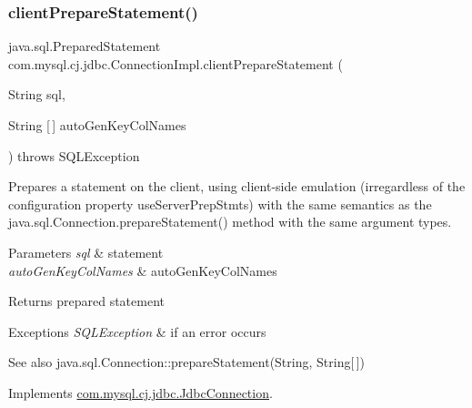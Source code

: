 \subsubsection{\texorpdfstring{client\+Prepare\+Statement()}{clientPrepareStatement()}\hspace{0.1cm}{\footnotesize\ttfamily [6/7]}}
{\footnotesize\ttfamily java.\+sql.\+Prepared\+Statement com.\+mysql.\+cj.\+jdbc.\+Connection\+Impl.\+client\+Prepare\+Statement (\begin{DoxyParamCaption}\item[{String}]{sql,  }\item[{String \mbox{[}$\,$\mbox{]}}]{auto\+Gen\+Key\+Col\+Names }\end{DoxyParamCaption}) throws S\+Q\+L\+Exception}

Prepares a statement on the client, using client-\/side emulation (irregardless of the configuration property \textquotesingle{}use\+Server\+Prep\+Stmts\textquotesingle{}) with the same semantics as the java.\+sql.\+Connection.\+prepare\+Statement() method with the same argument types.


\begin{DoxyParams}{Parameters}
{\em sql} & statement \\
\hline
{\em auto\+Gen\+Key\+Col\+Names} & auto\+Gen\+Key\+Col\+Names \\
\hline
\end{DoxyParams}
\begin{DoxyReturn}{Returns}
prepared statement 
\end{DoxyReturn}

\begin{DoxyExceptions}{Exceptions}
{\em S\+Q\+L\+Exception} & if an error occurs\\
\hline
\end{DoxyExceptions}
\begin{DoxySeeAlso}{See also}
java.\+sql.\+Connection\+::prepare\+Statement(\+String, String\mbox{[}$\,$\mbox{]}) 
\end{DoxySeeAlso}


Implements \mbox{\hyperlink{interfacecom_1_1mysql_1_1cj_1_1jdbc_1_1_jdbc_connection_a46a218367bb0a386a18caed711142d7a}{com.\+mysql.\+cj.\+jdbc.\+Jdbc\+Connection}}.

\mbox{\label{classcom_1_1mysql_1_1cj_1_1jdbc_1_1_connection_impl_ade6127c1a3fdabd2af201e60498afad4}} 

